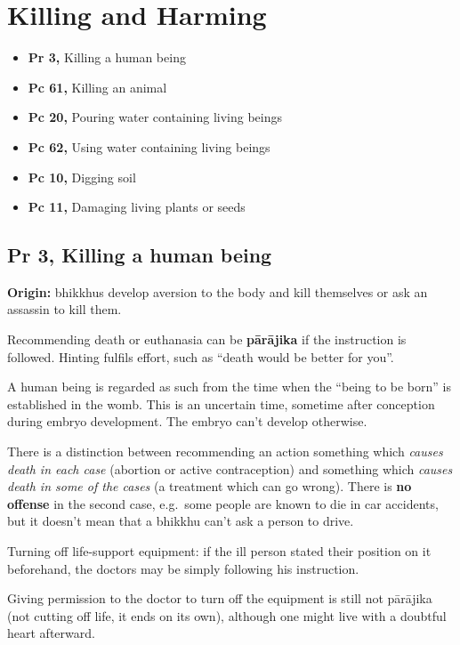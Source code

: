 \chapter{Killing and Harming}

\begin{itemize}
\tightlist
\item
  \textbf{Pr 3,} Killing a human being
\item
  \textbf{Pc 61,} Killing an animal
\item
  \textbf{Pc 20,} Pouring water containing living beings
\item
  \textbf{Pc 62,} Using water containing living beings
\item
  \textbf{Pc 10,} Digging soil
\item
  \textbf{Pc 11,} Damaging living plants or seeds
\end{itemize}

\section{Pr 3, Killing a human being}


\textbf{Origin:} bhikkhus develop aversion to the body and kill
themselves or ask an assassin to kill them.

Recommending death or euthanasia can be \textbf{pārājika} if the
instruction is followed. Hinting fulfils effort, such as ``death would
be better for you''.

A human being is regarded as such from the time when the ``being to be
born'' is established in the womb. This is an uncertain time, sometime
after conception during embryo development. The embryo can't develop
otherwise.

\enlargethispage*{\baselineskip}

There is a distinction between recommending an action something which
\emph{causes death in each case} (abortion or active contraception) and
something which \emph{causes death in some of the cases} (a treatment
which can go wrong). There is \textbf{no offense} in the second case,
e.g.~some people are known to die in car accidents, but it doesn't mean
that a bhikkhu can't ask a person to drive.

Turning off life-support equipment: if the ill person stated their
position on it beforehand, the doctors may be simply following his
instruction.

Giving permission to the doctor to turn off the equipment is still not
pārājika (not cutting off life, it ends on its own), although one might
live with a doubtful heart afterward.

